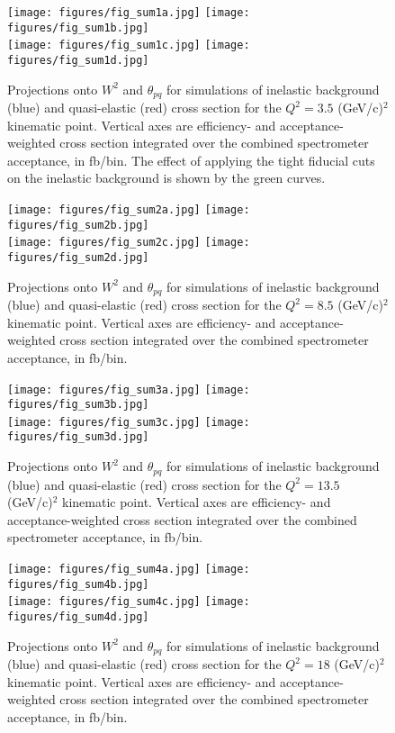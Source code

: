 \documentclass[12pt,letterpaper,oneside]{article}
\begin{document}
\begin{figure}
\texttt{[image: figures/fig\_sum1a.jpg]}\hfill
\texttt{[image: figures/fig\_sum1b.jpg]}\\
\vfill
\texttt{[image: figures/fig\_sum1c.jpg]}\hfill
\texttt{[image: figures/fig\_sum1d.jpg]}\\
\vfill
\caption{\label{kin1_sim} Projections onto $W^2$ and $\theta_{pq}$ 
for simulations of inelastic
background (blue) and quasi-elastic (red) cross section for the $Q^2=3.5$
(GeV/c)$^2$ kinematic point.   Vertical axes are efficiency- and
acceptance-weighted cross section integrated over the combined
spectrometer acceptance, in fb/bin.  The effect of applying the tight fiducial
cuts on the inelastic background is shown by the green curves.
}
\end{figure}


\begin{figure}
\texttt{[image: figures/fig\_sum2a.jpg]}\hfill
\texttt{[image: figures/fig\_sum2b.jpg]}\\
\vfill
\texttt{[image: figures/fig\_sum2c.jpg]}\hfill
\texttt{[image: figures/fig\_sum2d.jpg]}\\
\vfill
\caption{\label{kin2_sim}  Projections onto $W^2$ and $\theta_{pq}$ 
for simulations of inelastic
background (blue) and quasi-elastic (red) cross section for the $Q^2=8.5$
(GeV/c)$^2$ kinematic point.   Vertical axes are efficiency- and
acceptance-weighted cross section integrated over the combined
spectrometer acceptance, in fb/bin.
}
\end{figure}


\begin{figure}
\texttt{[image: figures/fig\_sum3a.jpg]}\hfill
\texttt{[image: figures/fig\_sum3b.jpg]}\\
\vfill
\texttt{[image: figures/fig\_sum3c.jpg]}\hfill
\texttt{[image: figures/fig\_sum3d.jpg]}\\
\vfill
\caption{\label{kin3_sim} Projections onto $W^2$ and $\theta_{pq}$ 
for simulations of inelastic
background (blue) and quasi-elastic (red) cross section for the $Q^2=13.5$
(GeV/c)$^2$ kinematic point.   Vertical axes are efficiency- and
acceptance-weighted cross section integrated over the combined
spectrometer acceptance, in fb/bin.
}
\end{figure}


\begin{figure}
\texttt{[image: figures/fig\_sum4a.jpg]}\hfill
\texttt{[image: figures/fig\_sum4b.jpg]}\\
\vfill
\texttt{[image: figures/fig\_sum4c.jpg]}\hfill
\texttt{[image: figures/fig\_sum4d.jpg]}\\
\vfill
\caption{\label{kin4_sim} Projections onto $W^2$ and $\theta_{pq}$ 
for simulations of inelastic
background (blue) and quasi-elastic (red) cross section for the $Q^2=18$
(GeV/c)$^2$ kinematic point.   Vertical axes are efficiency- and
acceptance-weighted cross section integrated over the combined
spectrometer acceptance, in fb/bin.
}
\end{figure}
\end{document}
